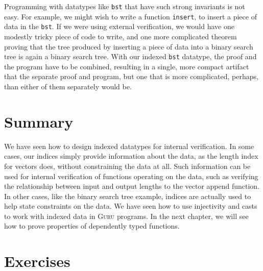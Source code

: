 \documentclass{book}[12pt]
\newcommand{\guru}[0]{\textsc{Guru}\xspace}
\begin{document}
Programming with datatypes like \texttt{bst} that have such strong
invariants is not easy.  For example, we might wish to write a
function \texttt{insert}, to insert a piece of data in the
\texttt{bst}.  If we were using external verification, we would have
one modestly tricky piece of code to write, and one more complicated
theorem proving that the tree produced by inserting a piece of data
into a binary search tree is again a binary search tree.  With our
indexed \texttt{bst} datatype, the proof and the program have to be
combined, resulting in a single, more compact artifact that the
separate proof and program, but one that is more complicated, perhaps,
than either of them separately would be.

\section{Summary}

We have seen how to design indexed datatypes for internal
verification.  In some cases, our indices simply provide information
about the data, as the length index for vectors does, without
constraining the data at all.  Such information can be used for
internal verification of functions operating on the data, such as
verifying the relationship between input and output lengths to the
vector append function.  In other cases, like the binary search tree
example, indices are actually used to help state constraints on the
data.  We have seen how to use injectivity and casts to work with
indexed data in \guru programs.  In the next chapter, we will see how
to prove properties of dependently typed functions.

\section{Exercises}
\end{document}
